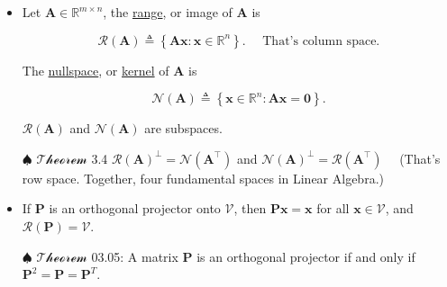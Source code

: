 \documentclass[12pt,thmsa]{article}
\begin{document}
\begin{itemize}
	\item Let \(\boldsymbol{A} \in \mathbb{R}^{m \times n}\), the \underline{range}, or image of \(\boldsymbol{A}\) is
	
	\begin{equation*}
		\mathcal{R}(\boldsymbol{A}) \triangleq\left\{\boldsymbol{A} \boldsymbol{x}: \boldsymbol{x} \in \mathbb{R}^{n}\right\}.  \quad \text { That's column space.}
	\end{equation*}
	
	The \underline{nullspace}, or \underline{kernel} of \(\boldsymbol{A}\) is
	
	\begin{equation*}
		\mathcal{N}(\boldsymbol{A}) \triangleq\left\{\boldsymbol{x} \in \mathbb{R}^{n}: \boldsymbol{A} \boldsymbol{x}=\mathbf{0}\right\}.
	\end{equation*}
	
	\(\mathcal{R}(\boldsymbol{A})\) and \(\mathcal{N}(\boldsymbol{A})\) are subspaces.
	
	\item[\(\spadesuit\)] \(\mathcal{Theorem}\) 3.4 \(\mathcal{R}(\boldsymbol{A})^{\perp}=\mathcal{N}\left(\boldsymbol{A}^{\top}\right)\) and \(\mathcal{N}(\boldsymbol{A})^{\perp}=\mathcal{R}\left(\boldsymbol{A}^{\top}\right) \quad\) (That's row space. Together, four fundamental spaces in Linear Algebra.)
	
	\item If \(\boldsymbol{P}\) is an orthogonal projector onto \(\mathcal{V}\), then \(\boldsymbol{P} \boldsymbol{x}=\boldsymbol{x}\) for all \(\boldsymbol{x} \in \mathcal{V}\), and \(\mathcal{R}(\boldsymbol{P})=\mathcal{V}\).
	
	\item[\(\spadesuit\)] \(\mathcal{Theorem}\) 03.05: A matrix \(\boldsymbol{P}\) is an orthogonal projector if and only if \(\boldsymbol{P}^{2}=\boldsymbol{P}=\boldsymbol{P}^{T}\).
\end{itemize}


\end{document}

